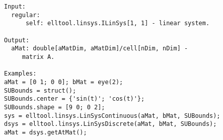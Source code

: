 \begin{enumerate}
\begin{lstlisting}
Input:
  regular:
      self: elltool.linsys.ILinSys[1, 1] - linear system.

Output:
  aMat: double[aMatDim, aMatDim]/cell[nDim, nDim] -
     matrix A.

Examples:
aMat = [0 1; 0 0]; bMat = eye(2);
SUBounds = struct();
SUBounds.center = {'sin(t)'; 'cos(t)'};
SUBounds.shape = [9 0; 0 2];
sys = elltool.linsys.LinSysContinuous(aMat, bMat, SUBounds);
dsys = elltool.linsys.LinSysDiscrete(aMat, bMat, SUBounds);
aMat = dsys.getAtMat();





\end{lstlisting}
\fontfamily{\familydefault}
\selectfont
\end{enumerate}
